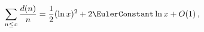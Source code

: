 \[\sum_{n\leq x}\frac{\mathop{d\/}\nolimits\!\left(n\right)}{n}=\frac{1}{2}(%
\mathop{\ln\/}\nolimits x)^{2}+2\EulerConstant\mathop{\ln\/}\nolimits x+%
\mathop{O\/}\nolimits\!\left(1\right),\]